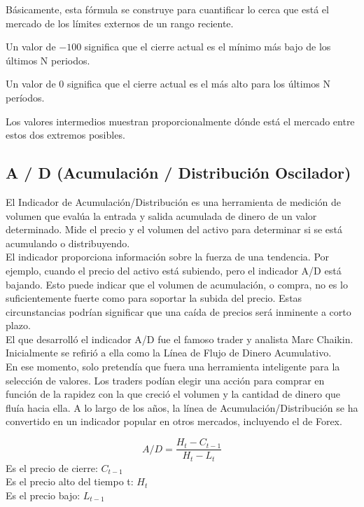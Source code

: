 \documentclass[letter, 12pt]{article}
\begin{document}
Básicamente, esta fórmula se construye para cuantificar lo cerca que está el mercado de los límites externos de un rango reciente.

Un valor de $-100$ significa que el cierre actual es el mínimo más bajo de los últimos N periodos.

Un valor de 0 significa que el cierre actual es el más alto para los últimos N períodos.

Los valores intermedios muestran proporcionalmente dónde está el mercado entre estos dos extremos posibles.

\subsection{ A / D (Acumulación / Distribución Oscilador) }

El Indicador de Acumulación/Distribución es una herramienta de medición de volumen que evalúa la entrada y salida acumulada de dinero de un valor determinado. Mide el precio y el volumen del activo para determinar si se está acumulando o distribuyendo. \\

El indicador proporciona información sobre la fuerza de una tendencia. Por ejemplo, cuando el precio del activo está subiendo, pero el indicador A/D está bajando. Esto puede indicar que el volumen de acumulación, o compra, no es lo suficientemente fuerte como para soportar la subida del precio. Estas circunstancias podrían significar que una caída de precios será inminente a corto plazo.\\

El que desarrolló el indicador A/D fue el famoso trader y analista Marc Chaikin. Inicialmente se refirió a ella como la Línea de Flujo de Dinero Acumulativo. \\

En ese momento, solo pretendía que fuera una herramienta inteligente para la selección de valores. Los traders podían elegir una acción para comprar en función de la rapidez con la que creció el volumen y la cantidad de dinero que fluía hacia ella. A lo largo de los años, la línea de Acumulación/Distribución se ha convertido en un indicador popular en otros mercados, incluyendo el de Forex.

$$A / D =\frac{H_{t} - C_{t-1}}{H_{t} - L_{t}} $$
Es el precio de cierre: $C_{t-1}$ \\
Es el precio alto del tiempo t: $H_{t}$   \\
Es el precio bajo: $L_{t-1}$ \\
\end{document}
